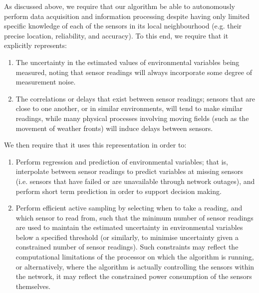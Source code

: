 \documentclass{acmsmall}
\begin{document}
\noindent As discussed above, we require that our algorithm be able to autonomously perform data acquisition and information processing despite having only limited specific knowledge of each of the sensors in its local neighbourhood (e.g. their precise location, reliability, and accuracy). To this end, we require that it explicitly represents:
\begin{enumerate}
\item The uncertainty in the estimated values of environmental variables being measured, noting that sensor readings will always incorporate some degree of measurement noise.
\item The correlations or delays that exist between sensor readings; sensors that are close to one another, or in similar environments, will tend to make similar readings, while many physical processes involving moving fields (such as the movement of weather fronts) will induce delays between sensors.
\end{enumerate}
We then require that it uses this representation in order to:
\begin{enumerate}
\item Perform regression and prediction of environmental variables; that is, interpolate between sensor readings to predict variables at missing sensors (i.e. sensors that have failed or are unavailable through network outages), and perform short term prediction in order to support decision making.
\item Perform efficient active sampling by selecting when to take a reading, and which sensor to read from, such that the minimum number of sensor readings are used to maintain the estimated uncertainty in environmental variables below a specified threshold (or similarly, to minimise uncertainty given a constrained number of sensor readings). Such constraints may reflect the computational limitations of the processor on which the algorithm is running, or alternatively, where the algorithm is actually controlling the sensors within the network, it may reflect the constrained power consumption of the sensors themselves.
\end{enumerate}
\end{document}
